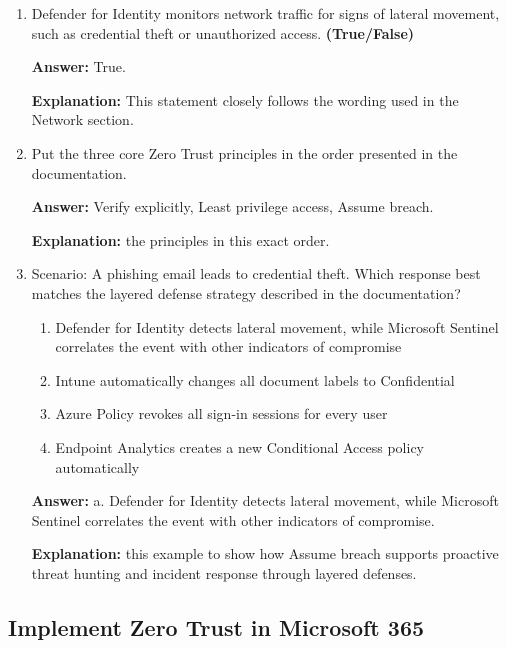 \documentclass[10pt]{article}
\begin{document}
\begin{enumerate}[leftmargin=*]
\textbf{Explanation:} Azure Firewall can restrict outbound traffic to known safe destinations.

\item Defender for Identity monitors network traffic for signs of lateral movement, such as credential theft or unauthorized access. \textbf{(True/False)}

\textbf{Answer:} True.

\textbf{Explanation:} This statement closely follows the wording used in the Network section.

\item Put the three core Zero Trust principles in the order presented in the documentation.

\textbf{Answer:} Verify explicitly, Least privilege access, Assume breach.

\textbf{Explanation:} the principles in this exact order.

\item Scenario: A phishing email leads to credential theft. Which response best matches the layered defense strategy described in the documentation?
\begin{enumerate}[label=\alph*., leftmargin=1.5em]
\item Defender for Identity detects lateral movement, while Microsoft Sentinel correlates the event with other indicators of compromise
\item Intune automatically changes all document labels to Confidential
\item Azure Policy revokes all sign-in sessions for every user
\item Endpoint Analytics creates a new Conditional Access policy automatically
\end{enumerate}
\textbf{Answer:} a. Defender for Identity detects lateral movement, while Microsoft Sentinel correlates the event with other indicators of compromise.

\textbf{Explanation:} this example to show how Assume breach supports proactive threat hunting and incident response through layered defenses.

\end{enumerate}

\subsection{Implement Zero Trust in Microsoft 365}
\end{document}
